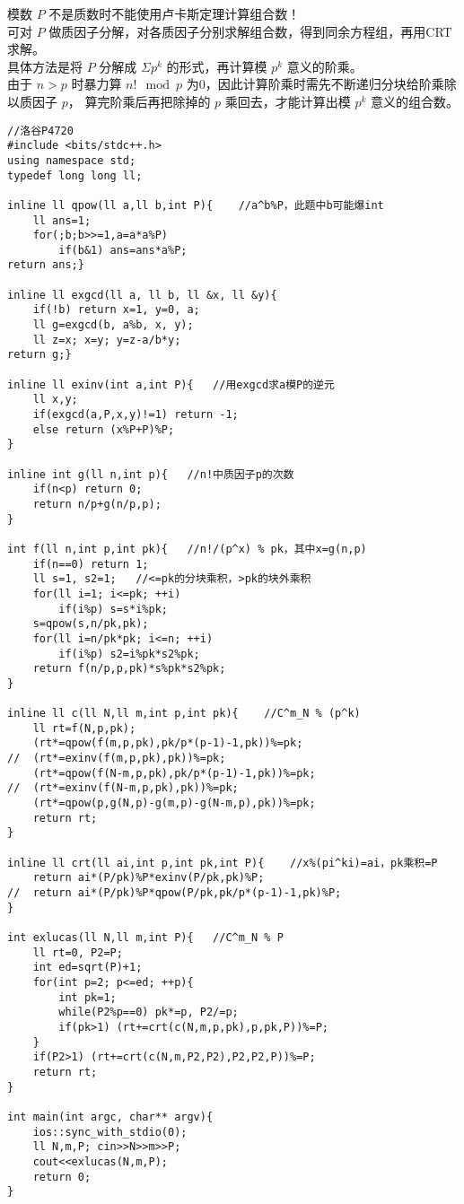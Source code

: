 模数 $P$ 不是质数时不能使用卢卡斯定理计算组合数！\\
可对 $P$ 做质因子分解，对各质因子分别求解组合数，得到同余方程组，再用CRT求解。\\
具体方法是将 $P$ 分解成 $\Sigma p^k$ 的形式，再计算模 $p^k$ 意义的阶乘。 \\
由于 $n > p$ 时暴力算 $n! \mod p$ 为0，因此计算阶乘时需先不断递归分块给阶乘除以质因子 $p$，
算完阶乘后再把除掉的 $p$ 乘回去，才能计算出模 $p^k$ 意义的组合数。 
\begin{lstlisting}
//洛谷P4720
#include <bits/stdc++.h>
using namespace std;
typedef long long ll;

inline ll qpow(ll a,ll b,int P){	//a^b%P，此题中b可能爆int
	ll ans=1;
	for(;b;b>>=1,a=a*a%P)
		if(b&1) ans=ans*a%P;
return ans;}

inline ll exgcd(ll a, ll b, ll &x, ll &y){
	if(!b) return x=1, y=0, a;
	ll g=exgcd(b, a%b, x, y);
	ll z=x; x=y; y=z-a/b*y;
return g;}

inline ll exinv(int a,int P){	//用exgcd求a模P的逆元 
	ll x,y;
	if(exgcd(a,P,x,y)!=1) return -1;
	else return (x%P+P)%P;
}

inline int g(ll n,int p){	//n!中质因子p的次数
	if(n<p) return 0;
	return n/p+g(n/p,p);
}

int f(ll n,int p,int pk){	//n!/(p^x) % pk，其中x=g(n,p)
	if(n==0) return 1;
	ll s=1, s2=1;	//<=pk的分块乘积，>pk的块外乘积
	for(ll i=1; i<=pk; ++i)
		if(i%p) s=s*i%pk;
	s=qpow(s,n/pk,pk);
	for(ll i=n/pk*pk; i<=n; ++i)
		if(i%p) s2=i%pk*s2%pk; 
	return f(n/p,p,pk)*s%pk*s2%pk;
}

inline ll c(ll N,ll m,int p,int pk){	//C^m_N % (p^k)
	ll rt=f(N,p,pk);
	(rt*=qpow(f(m,p,pk),pk/p*(p-1)-1,pk))%=pk;
//	(rt*=exinv(f(m,p,pk),pk))%=pk;
	(rt*=qpow(f(N-m,p,pk),pk/p*(p-1)-1,pk))%=pk;
//	(rt*=exinv(f(N-m,p,pk),pk))%=pk;
	(rt*=qpow(p,g(N,p)-g(m,p)-g(N-m,p),pk))%=pk;
	return rt;
}

inline ll crt(ll ai,int p,int pk,int P){	//x%(pi^ki)=ai，pk乘积=P
	return ai*(P/pk)%P*exinv(P/pk,pk)%P;
//	return ai*(P/pk)%P*qpow(P/pk,pk/p*(p-1)-1,pk)%P;
}

int exlucas(ll N,ll m,int P){	//C^m_N % P
	ll rt=0, P2=P;
	int ed=sqrt(P)+1;
	for(int p=2; p<=ed; ++p){
		int pk=1;
		while(P2%p==0) pk*=p, P2/=p;
		if(pk>1) (rt+=crt(c(N,m,p,pk),p,pk,P))%=P;
	}
	if(P2>1) (rt+=crt(c(N,m,P2,P2),P2,P2,P))%=P;
	return rt;
}

int main(int argc, char** argv){
	ios::sync_with_stdio(0);
	ll N,m,P; cin>>N>>m>>P;
	cout<<exlucas(N,m,P);
	return 0;
}

\end{lstlisting}